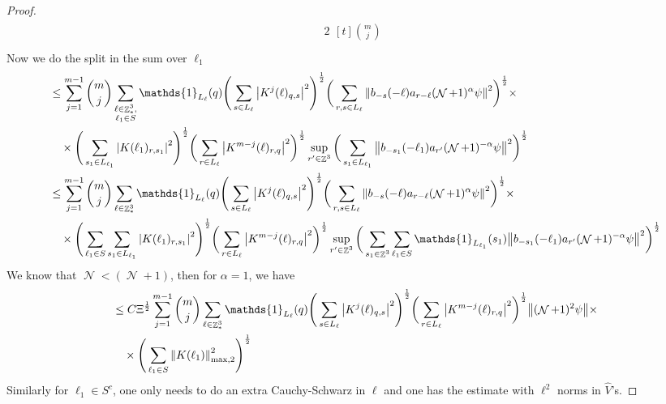 \documentclass[12pt,a4paper]{article}
\numberwithin{equation}{section}
\newcommand{\1}{\mathbb{I}}
\DeclareMathOperator{\Z}{\mathbb{Z}}
\DeclareMathOperator{\NN}{\mathcal{N}}
\newcommand{\half}{\frac{1}{2}}
\newcommand{\normmaxii}[1]{\norm{#1}_{\mathrm{max,2}}}
\theoremstyle{plain}
\theoremstyle{definition}
\theoremstyle{remark}
\theoremstyle{plain}
\theoremstyle{definition}
\theoremstyle{remark}
\begin{document}
\begin{proof}
\begin{alignat}{2}
\begin{aligned}[t] {{m}\choose j}
		\end{aligned} \nonumber\\   
	\end{alignat}
Now we do the split in the sum over $\ell_1$
\begin{alignat}{2}
	&\leq \sum\limits_{j=1}^{m-1} {{m}\choose j} \sum\limits_{\substack{\ell \in \Z^3_*,\\\ell_1 \in S}} \mathds{1}_{L_{\ell}}(q) 
	\Bigg( \sum\limits_{s \in L_\ell} \abs{K^{j}(\ell)_{q,s}}^2\Bigg)^\half \bigg( \sum\limits_{r,s \in L_\ell}\norm{  b_{-s}(-\ell) a_{r-\ell} (\NN+1)^{\alpha}\psi}^2\bigg)^\half \times\nonumber\\ &\quad\times \Bigg( \sum\limits_{s_1 \in L_{\ell_1}}\abs{K(\ell_1)_{r,s_1}}^2\Bigg)^\half \bigg(\sum\limits_{r \in L_{\ell}}\abs{ K^{m-j}(\ell)_{r,q}  }^2\bigg)^\half \sup_{r' \in \Z^3}\bigg(\sum\limits_{s_1 \in L_{\ell_1}}\norm{ b_{-s_1}(-\ell_1)  a_{r'} (\NN+1)^{-\alpha}\psi }^2\bigg)^\half\nonumber\\ 
	&\leq \sum\limits_{j=1}^{m-1} {{m}\choose j} \sum\limits_{\ell \in \Z^3_*} \mathds{1}_{L_{\ell}}(q) 
	\Bigg( \sum\limits_{s \in L_\ell} \abs{K^{j}(\ell)_{q,s}}^2\Bigg)^\half \bigg( \sum\limits_{r,s \in L_\ell}\norm{  b_{-s}(-\ell) a_{r-\ell} (\NN+1)^{\alpha}\psi}^2\bigg)^\half \times\nonumber\\ &\quad\times \Bigg(\sum\limits_{\ell_1 \in S} \sum\limits_{s_1 \in L_{\ell_1}}\abs{K(\ell_1)_{r,s_1}}^2\Bigg)^\half \bigg(\sum\limits_{r \in L_{\ell}}\abs{ K^{m-j}(\ell)_{r,q}  }^2\bigg)^\half \sup_{r' \in \Z^3}\bigg(\sum\limits_{s_1 \in \Z^3} \sum\limits_{\ell_1 \in S}\mathds{1}_{L_{\ell_1}}(s_1) \norm{ b_{-s_1}(-\ell_1)  a_{r'} (\NN+1)^{-\alpha}\psi }^2\bigg)^\half\nonumber\\ 
	\end{alignat}
	We know that $\NN<(\NN+1)$, then for $\alpha = 1$, we have
	\begin{alignat}{2}
	&\leq C \Xi^\half \sum\limits_{j=1}^{m-1} {{m}\choose j} \sum\limits_{\ell \in \Z^3_*} \mathds{1}_{L_{\ell}}(q) 
	\Bigg( \sum\limits_{s \in L_\ell} \abs{K^{j}(\ell)_{q,s}}^2\Bigg)^\half \bigg(\sum\limits_{r \in L_{\ell}}\abs{ K^{m-j}(\ell)_{r,q}  }^2\bigg)^\half\norm{  (\NN+1)^{2}\psi} \times\nonumber\\ &\quad\times \Bigg(\sum\limits_{\ell_1 \in S} \normmaxii{K(\ell_1)}^2\Bigg)^\half \nonumber\\ \label{eq:estEQ2112}
	\end{alignat}
Similarly for $\ell_1 \in S^c$, one only needs to do an extra Cauchy-Schwarz in $\ell$ and one has the estimate with $\ell^2$ norms in $\hat{V}$'s.\newline 

\end{proof}
\end{document}
